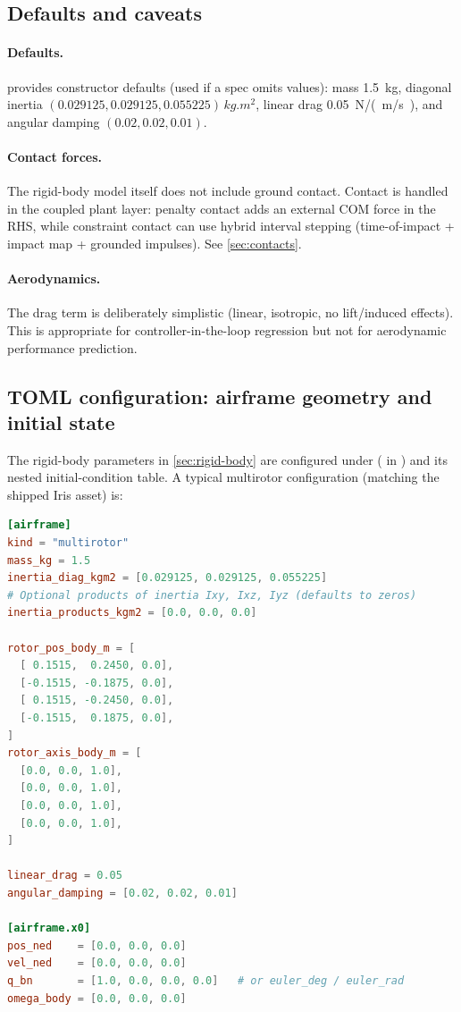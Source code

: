 \subsection{Defaults and caveats}
\paragraph{Defaults.}  provides constructor defaults (used if a spec omits values): mass \SI{1.5}{kg}, diagonal inertia \((0.029125,0.029125,0.055225)\,\si{kg.m^2}\), linear drag \SI{0.05}{N/(m/s)}, and angular damping $(0.02,0.02,0.01)$.

\paragraph{Contact forces.} The rigid-body model itself does not include ground contact. Contact is handled in the coupled plant layer: penalty contact adds an external COM force in the RHS, while constraint contact can use hybrid interval stepping (time-of-impact + impact map + grounded impulses). See \cref{sec:contacts}.

\paragraph{Aerodynamics.} The drag term is deliberately simplistic (linear, isotropic, no lift/induced effects). This is appropriate for controller-in-the-loop regression but not for aerodynamic performance prediction.

\subsection{TOML configuration: airframe geometry and initial state}
\label{sec:airframe-toml}

The rigid-body parameters in \cref{sec:rigid-body} are configured under \code{[airframe]} ( in ) and its nested \code{[airframe.x0]} initial-condition table. A typical multirotor configuration (matching the shipped Iris asset) is:

\begin{lstlisting}[language=toml]
[airframe]
kind = "multirotor"
mass_kg = 1.5
inertia_diag_kgm2 = [0.029125, 0.029125, 0.055225]
# Optional products of inertia Ixy, Ixz, Iyz (defaults to zeros)
inertia_products_kgm2 = [0.0, 0.0, 0.0]

rotor_pos_body_m = [
  [ 0.1515,  0.2450, 0.0],
  [-0.1515, -0.1875, 0.0],
  [ 0.1515, -0.2450, 0.0],
  [-0.1515,  0.1875, 0.0],
]
rotor_axis_body_m = [
  [0.0, 0.0, 1.0],
  [0.0, 0.0, 1.0],
  [0.0, 0.0, 1.0],
  [0.0, 0.0, 1.0],
]

linear_drag = 0.05
angular_damping = [0.02, 0.02, 0.01]

[airframe.x0]
pos_ned    = [0.0, 0.0, 0.0]
vel_ned    = [0.0, 0.0, 0.0]
q_bn       = [1.0, 0.0, 0.0, 0.0]   # or euler_deg / euler_rad
omega_body = [0.0, 0.0, 0.0]
\end{lstlisting}


